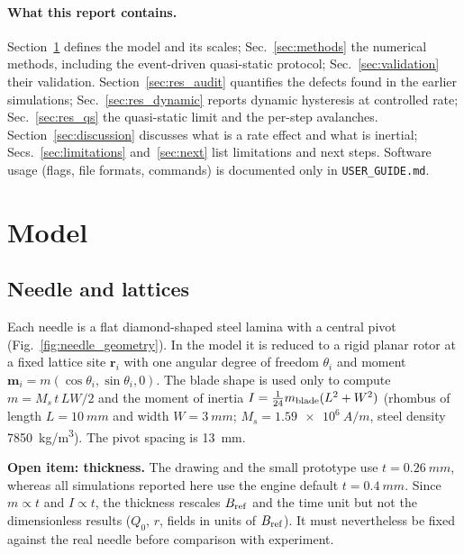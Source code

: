 \documentclass[11pt,a4paper]{article}
\newcommand{\code}[1]{\texttt{#1}}
\newcommand{\vect}[1]{\boldsymbol{#1}}
\begin{document}
\paragraph{What this report contains.} Section~\ref{sec:model} defines the model and its scales; Sec.~\ref{sec:methods} the numerical methods, including the event-driven quasi-static protocol; Sec.~\ref{sec:validation} their validation. Section~\ref{sec:res_audit} quantifies the defects found in the earlier simulations; Sec.~\ref{sec:res_dynamic} reports dynamic hysteresis at controlled rate; Sec.~\ref{sec:res_qs} the quasi-static limit and the per-step avalanches. Section~\ref{sec:discussion} discusses what is a rate effect and what is inertial; Secs.~\ref{sec:limitations} and~\ref{sec:next} list limitations and next steps. Software usage (flags, file formats, commands) is documented only in \code{USER\_GUIDE.md}.

\section{Model}
\label{sec:model}

\subsection{Needle and lattices}

Each needle is a flat diamond-shaped steel lamina with a central pivot (Fig.~\ref{fig:needle_geometry}). In the model it is reduced to a rigid planar rotor at a fixed lattice site $\vect r_i$ with one angular degree of freedom $\theta_i$ and moment $\vect m_i=m(\cos\theta_i,\sin\theta_i,0)$. The blade shape is used only to compute $m=M_s\,t\,LW/2$ and the moment of inertia $I=\tfrac1{24}m_{\rm blade}(L^2+W^2)$ (rhombus of length $L=\SI{10}{mm}$ and width $W=\SI{3}{mm}$; $M_s=\SI{1.59e6}{A/m}$, steel density \SI{7850}{kg/m^3}). The pivot spacing is \SI{13}{mm}.

\textbf{Open item: thickness.} The drawing and the small prototype use $t=\SI{0.26}{mm}$, whereas all simulations reported here use the engine default $t=\SI{0.4}{mm}$. Since $m\propto t$ and $I\propto t$, the thickness rescales $B_{\rm ref}$ and the time unit but not the dimensionless results ($Q_0$, $r$, fields in units of $B_{\rm ref}$). It must nevertheless be fixed against the real needle before comparison with experiment.
\end{document}

